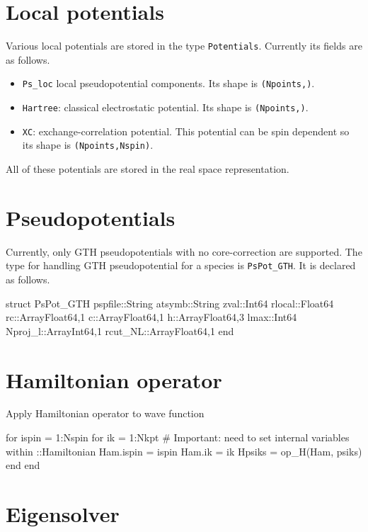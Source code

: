\documentclass[a4paper,12pt]{article}
\newcommand{\jlcode}[1]{\texttt{#1}}
\begin{document}
\section{Local potentials}

Various local potentials are stored in the type \jlcode{Potentials}. Currently
its fields are as follows.
\begin{itemize}
%
\item \jlcode{Ps_loc} local pseudopotential components.
  Its shape is \jlcode{(Npoints,)}.
%
\item \jlcode{Hartree}: classical electrostatic potential.
  Its shape is \jlcode{(Npoints,)}.
%
\item \jlcode{XC}: exchange-correlation potential. This potential can be spin
  dependent so its shape is \jlcode{(Npoints,Nspin)}.
%
\end{itemize}

All of these potentials are stored in the real space representation.


\section{Pseudopotentials}

Currently, only GTH pseudopotentials with no core-correction are supported.
The type for handling GTH pseudopotential for a species is \jlcode{PsPot_GTH}.
It is declared as follows.

\begin{juliacode}
struct PsPot_GTH
    pspfile::String
    atsymb::String
    zval::Int64
    rlocal::Float64
    rc::Array{Float64,1}
    c::Array{Float64,1}
    h::Array{Float64,3}
    lmax::Int64
    Nproj_l::Array{Int64,1}
    rcut_NL::Array{Float64,1}
end
\end{juliacode}

\section{Hamiltonian operator}

Apply Hamiltonian operator to wave function
\begin{juliacode}
for ispin = 1:Nspin
    for ik = 1:Nkpt
        # Important: need to set internal variables within ::Hamiltonian
        Ham.ispin = ispin
        Ham.ik = ik
        Hpsiks = op_H(Ham, psiks)
    end
end
\end{juliacode}


\section{Eigensolver}
\end{document}
